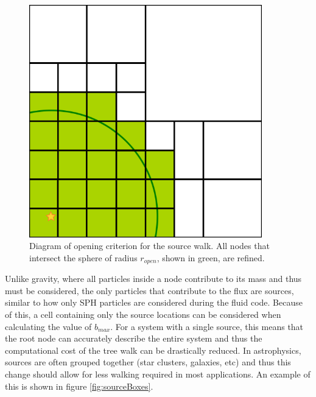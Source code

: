 \begin{figure}[H]
    \centering
    \includegraphics[width=0.9\textwidth]{plots/CH3/openingCritereon.png}
    \caption{Diagram of opening criterion for the source walk. All nodes that intersect the sphere of radius $r_{open}$, shown in green, are refined.}
    \label{fig:opening}
\end{figure}

Unlike gravity, where all particles inside a node contribute to its mass and thus must be considered, the only particles that contribute to the flux are sources, similar to how only SPH particles are considered during the fluid code. Because of this, a cell containing only the source locations can be considered when calculating the value of $b_{max}$. For a system with a single source, this means that the root node can accurately describe the entire system and thus the computational cost of the tree walk can be drastically reduced. In astrophysics, sources are often grouped together (star clusters, galaxies, etc) and thus this change should allow for less walking required in most applications. An example of this is shown in figure \ref{fig:sourceBoxes}.


